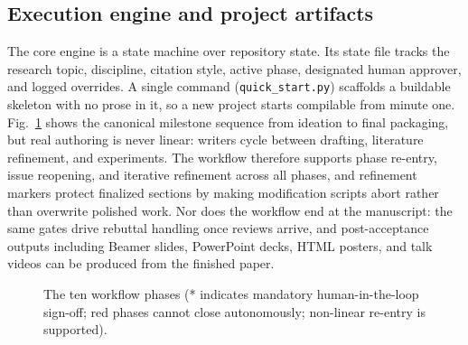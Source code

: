 \documentclass[conference]{IEEEtran}
\begin{document}
\subsection{Execution engine and project artifacts}
The core engine is a state machine over repository state. Its state file tracks the research topic, discipline, citation style, active phase, designated human approver, and logged overrides. A single command (\texttt{quick\_start.py}) scaffolds a buildable skeleton with no prose in it, so a new project starts compilable from minute one. Fig.~\ref{fig:gates} shows the canonical milestone sequence from ideation to final packaging, but real authoring is never linear: writers cycle between drafting, literature refinement, and experiments. The workflow therefore supports phase re-entry, issue reopening, and iterative refinement across all phases, and refinement markers protect finalized sections by making modification scripts abort rather than overwrite polished work. Nor does the workflow end at the manuscript: the same gates drive rebuttal handling once reviews arrive, and post-acceptance outputs including Beamer slides, PowerPoint decks, HTML posters, and talk videos can be produced from the finished paper.

\begin{figure}[t]
\centering
{}
\caption{The ten workflow phases (* indicates mandatory human-in-the-loop sign-off; red phases cannot close autonomously; non-linear re-entry is supported).}
\label{fig:gates}
\end{figure}
\end{document}
